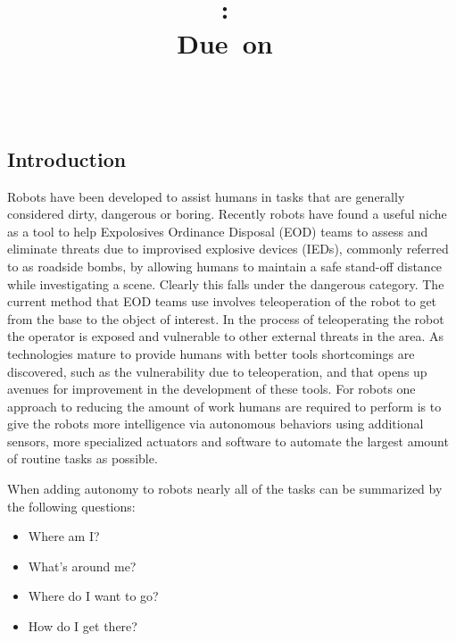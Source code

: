 \documentclass[12pt]{report}
\title{\vspace{2in}\textmd{\textbf{\hmwkClass:\ \hmwkTitle\ifthenelse{\equal{\hmwkSubTitle}{}}{}{\\\hmwkSubTitle}}}\\\normalsize\vspace{0.1in}\small{Due\ on\ \hmwkDueDate}\\\vspace{0.1in}\large{\textit{\hmwkClassInstructor\ \hmwkClassTime}}\vspace{3in}}
\date{}
\author{\textbf{\hmwkAuthorName}}
\begin{document}
\begin{spacing}{1.1}
\maketitle
\thispagestyle{empty}

\newpage
\thispagestyle{empty}
\mbox{}
\newpage
{}

\tableofcontents
\clearpage
\listoffigures
\listoftables
\clearpage

\chapter{Introduction}
Robots have been developed to assist humans in tasks that are generally considered dirty, dangerous or boring. Recently robots have found a useful niche as a tool to help Expolosives Ordinance Disposal (EOD) teams to assess and eliminate threats due to improvised explosive devices (IEDs), commonly referred to as roadside bombs, by allowing humans to maintain a safe stand-off distance while investigating a scene. Clearly this falls under the dangerous category. The current method that EOD teams use involves teleoperation of the robot to get from the base to the object of interest. In the process of teleoperating the robot the operator is exposed and vulnerable to other external threats in the area. As technologies mature to provide humans with better tools shortcomings are discovered, such as the vulnerability due to teleoperation, and that opens up avenues for improvement in the development of these tools. For robots one approach to reducing the amount of work humans are required to perform is to give the robots more intelligence via autonomous behaviors using additional sensors, more specialized actuators and software to automate the largest amount of routine tasks as possible.

When adding autonomy to robots nearly all of the tasks can be summarized by the following questions:
\begin{itemize}
\item Where am I?
\item What's around me?
\item Where do I want to go?
\item How do I get there?
\end{itemize}


\end{spacing}
\end{document}
